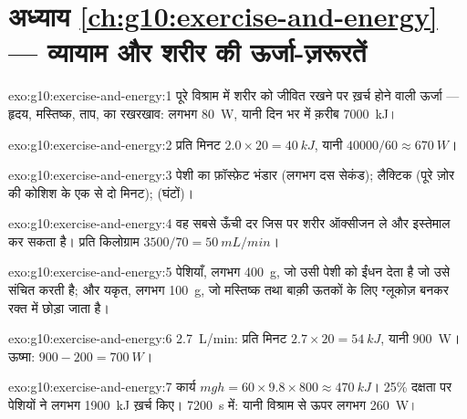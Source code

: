 \section*{अध्याय \ref{ch:g10:exercise-and-energy} --- व्यायाम और शरीर की ऊर्जा-ज़रूरतें}

\begin{solution}{exo:g10:exercise-and-energy:1}
पूरे विश्राम में शरीर को जीवित रखने पर ख़र्च होने वाली ऊर्जा --- हृदय,
मस्तिष्क, ताप,  का रखरखाव: लगभग \qty{80}{W}, यानी दिन भर में
क़रीब \qty{7000}{kJ}।
\end{solution}

\begin{solution}{exo:g10:exercise-and-energy:2}
प्रति मिनट $2.0 \times 20 = \qty{40}{kJ}$, यानी $40000/60 \approx
\qty{670}{W}$।
\end{solution}

\begin{solution}{exo:g10:exercise-and-energy:3}
पेशी का फ़ॉस्फ़ेट भंडार (लगभग दस सेकंड); लैक्टिक  (पूरे ज़ोर की
कोशिश के एक से दो मिनट);  (घंटों)।
\end{solution}

\begin{solution}{exo:g10:exercise-and-energy:4}
वह सबसे ऊँची दर जिस पर शरीर ऑक्सीजन ले और इस्तेमाल कर सकता है। प्रति
किलोग्राम $3500/70 = \qty{50}{mL/min}$।
\end{solution}

\begin{solution}{exo:g10:exercise-and-energy:5}
पेशियाँ, लगभग \qty{400}{g}, जो उसी पेशी को ईंधन देता है जो उसे संचित करती
है; और यकृत, लगभग \qty{100}{g}, जो मस्तिष्क तथा बाक़ी ऊतकों के लिए
ग्लूकोज़ बनकर रक्त में छोड़ा जाता है।
\end{solution}

\begin{solution}{exo:g10:exercise-and-energy:6}
\qty{2.7}{L/min}: प्रति मिनट $2.7 \times 20 = \qty{54}{kJ}$, यानी
\qty{900}{W}। ऊष्मा: $900 - 200 = \qty{700}{W}$।
\end{solution}

\begin{solution}{exo:g10:exercise-and-energy:7}
कार्य $mgh = 60 \times 9.8 \times 800 \approx \qty{470}{kJ}$। 25\%
दक्षता पर पेशियों ने लगभग \qty{1900}{kJ} ख़र्च किए। \qty{7200}{s} में:
यानी विश्राम से ऊपर लगभग \qty{260}{W}।
\end{solution}

